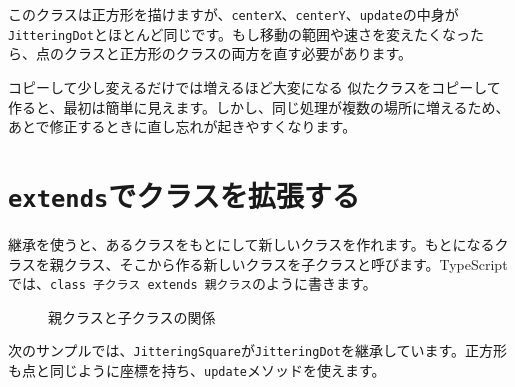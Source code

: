 このクラスは正方形を描けますが、\texttt{centerX}、\texttt{centerY}、\texttt{update}の中身が\texttt{JitteringDot}とほとんど同じです。もし移動の範囲や速さを変えたくなったら、点のクラスと正方形のクラスの両方を直す必要があります。

\begin{mistakebox}{コピーして少し変えるだけでは増えるほど大変になる}
似たクラスをコピーして作ると、最初は簡単に見えます。しかし、同じ処理が複数の場所に増えるため、あとで修正するときに直し忘れが起きやすくなります。
\end{mistakebox}

\section{\texttt{extends}でクラスを拡張する}

継承を使うと、あるクラスをもとにして新しいクラスを作れます。もとになるクラスを親クラス、そこから作る新しいクラスを子クラスと呼びます。TypeScriptでは、\texttt{class 子クラス extends 親クラス}のように書きます。

\begin{figure}[htbp]
    \centering
    \caption{親クラスと子クラスの関係}
    \label{fig:chapter14-parent-child}
\end{figure}

次のサンプルでは、\texttt{JitteringSquare}が\texttt{JitteringDot}を継承しています。正方形も点と同じように座標を持ち、\texttt{update}メソッドを使えます。

\begin{listing}[htbp]
\inputminted[firstline=1,lastline=25]{ts}{typescript-p5/listings/chapter14/jittering-square-inheritance.ts}
\caption{親クラスになる\texttt{JitteringDot}（\texttt{chapter14/jittering-square-inheritance.ts}）}
\label{lst:chapter14-jittering-square-inheritance-parent}
\end{listing}

